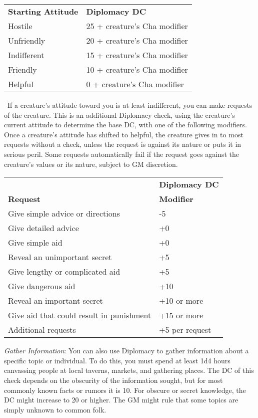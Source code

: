 \begin{table}
 \sffamily
 \begin{tabular}{ll}
\textbf{Starting Attitude} & \textbf{Diplomacy DC}\\
Hostile & 25 + creature's Cha modifier\\
Unfriendly & 20 + creature's Cha modifier\\
Indifferent & 15 + creature's Cha modifier\\
Friendly & 10 + creature's Cha modifier\\
Helpful & 0 + creature's Cha modifier\\
 \end{tabular}

\end{table}
\	
If a creature's attitude toward you is at least indifferent, you can make requests of the creature. This is an additional Diplomacy check, using the creature's current attitude to determine the base DC, with one of the following modifiers. Once a creature's attitude has shifted to helpful, the creature gives in to most requests without a check, unless the request is against its nature or puts it in serious peril. Some requests automatically fail if the request goes against the creature's values or its nature, subject to GM discretion.

\begin{table}
\sffamily
 \begin{tabular}{ll}
                 & \textbf{Diplomacy DC} \\
\textbf{Request} & \textbf{Modifier}\\
Give simple advice or directions & -5\\
Give detailed advice & +0\\
Give simple aid & +0\\
Reveal an unimportant secret & +5\\
Give lengthy or complicated aid & +5\\
Give dangerous aid & +10\\
Reveal an important secret & +10 or more\\
Give aid that could result in punishment & +15 or more\\
Additional requests & +5 per request\\
 \end{tabular}

\end{table}

				
\textit{Gather Information}: You can also use Diplomacy to gather information about a specific topic or individual. To do this, you must spend at least 1d4 hours canvassing people at local taverns, markets, and gathering places. The DC of this check depends on the obscurity of the information sought, but for most commonly known facts or rumors it is 10. For obscure or secret knowledge, the DC might increase to 20 or higher. The GM might rule that some topics are simply unknown to common folk.
				
